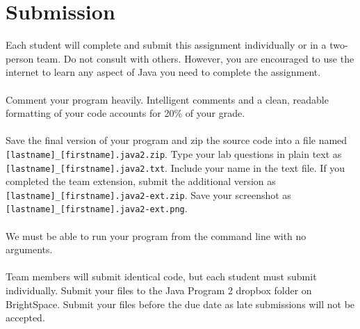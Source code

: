 \documentclass{article}
\begin{document}
\section*{Submission}
Each student will complete and submit this assignment individually or in a two-person team. Do not consult with others. However, you are encouraged to use the internet to learn any aspect of Java you need to complete the assignment.
\\\\
Comment your program heavily. Intelligent comments and a clean, readable formatting of your code accounts for 20\% of your grade.
\\\\
Save the final version of your program and zip the source code into a file named \verb|[lastname]_[firstname].java2.zip|. Type your lab questions in plain text as \verb|[lastname]_[firstname].java2.txt|. Include your name in the text file. If you completed the team extension, submit the additional version as \verb|[lastname]_[firstname].java2-ext.zip|. Save your screenshot as \verb|[lastname]_[firstname].java2-ext.png|.
\\\\
We must be able to run your program from the command line with no arguments.
\\\\
Team members will submit identical code, but each student must submit individually. Submit your files to the Java Program 2 dropbox folder on BrightSpace. Submit your files before the due date as late submissions will not be accepted.
\end{document}
